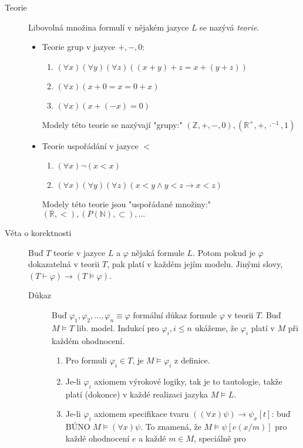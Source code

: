 \documentclass[a4paper]{article}
\begin{document}
\begin{description}
		\item[Teorie] Libovolná množina formulí v nějakém jazyce $L$ se nazývá \textit{teorie}.
			\begin{itemize}
				\item Teorie grup v jazyce $+, -, 0$:
					\begin{enumerate}
						\item $(\forall x)(\forall y)(\forall z) ((x + y) + z = x + (y + z))$
						\item $(\forall x) (x + 0 = x = 0 + x)$ 
						\item $(\forall x) (x + (-x) = 0)$
					\end{enumerate}
					Modely této teorie se nazývají "grupy:"
					$(\mathbb{Z}, +, -, 0), (\mathbb{R}^+, +, \cdot^{-1}, 1)$
				\item Teorie uspořádání v jazyce $<$
					 \begin{enumerate}
						 \item $(\forall x) \neg (x < x)$
						 \item $(\forall x)(\forall y)(\forall z) (x < y \land y < z \to x < z)$
					\end{enumerate}
					Modely této teorie jsou "uspořádané množiny:"
					$(\mathbb{R}, <), (P(\mathbb{N}), \subset), \ldots$
			\end{itemize}
		\item[Věta o korektnosti] Buď $T$ teorie v jazyce $L$ a $\varphi$ nějaká formule $L$.
			Potom pokud je $\varphi$ dokazatelná v teorii $T$, pak platí v každém jejím modelu.
			Jinými slovy, $(T \vdash \varphi) \to (T \models \varphi)$.
			\begin{description}
				\item[Důkaz] Buď $\varphi_1, \varphi_2, \ldots, \varphi_n \equiv \varphi$ formální důkaz formule
					$\varphi$ v teorii $T$. Buď $M \models T$ lib. model.
					Indukcí pro $\varphi_i, i \le n$ ukážeme, že $\varphi_i$ platí v $M$ při
					každém ohodnocení.
					\begin{enumerate}
						\item Pro formuli $\varphi_i \in T$, je $M \models \varphi_i$ z definice. 
						\item Je-li $\varphi_i$ axiomem výrokové logiky, tak je to tautologie,
							takže platí (dokonce) v každé realizaci jazyka $M \models L$.
						\item Je-li $\varphi_i$ axiomem specifikace tvaru
							$((\forall x) \psi) \to \psi_x[t]$: buď BÚNO
							$M \models (\forall x) \psi$. To znamená, že $M \models \psi[e(x/m)]$ 
							pro každé ohodnocení $e$ a každé $m \in M$, speciálně pro

\end{enumerate}
\end{description}
\end{description}
\end{document}
